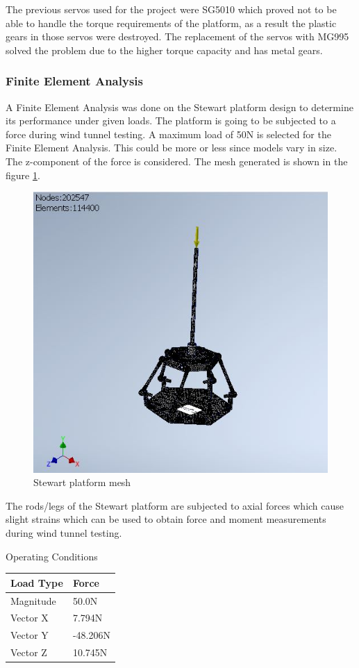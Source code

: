 The previous servos used for the project were SG5010 which proved not to be able to handle the torque requirements of the platform,
as a result the plastic gears in those servos were destroyed. The replacement of the servos with MG995 solved the problem due to the higher torque capacity and has metal gears.

\subsubsection{Finite Element Analysis}
A Finite Element Analysis was done on the Stewart platform design to determine its performance under given loads. The platform is going to be subjected to a force during wind tunnel testing. A maximum load of 50N is selected for the Finite Element Analysis. This could be more or less since models vary in size. The z-component of the force is considered.
The mesh generated is shown in the figure \ref{fig:feamesh}.
\begin{center}
	\begin{figure}[H]
		\centering
		\includegraphics[width=0.75\linewidth]{Figures/FEA}
		\caption[Stewart platform mesh]{Stewart platform mesh}
		\label{fig:feamesh}
	\end{figure}
\end{center}
The rods/legs of the Stewart platform are subjected to axial forces which cause slight strains which can be used to obtain force and moment measurements during wind tunnel testing.
\clearpage
\begin{center}
	\begin{table}[H]
		\caption{Operating Conditions}
		\centering
	\end{table}
	\begin{tabular}{|l|l|}
		\hline
		\textbf{Load Type} & \textbf{Force} \\
		\hline
		Magnitude          & 50.0N          \\
		\hline
		Vector X           & 7.794N         \\
		\hline
		Vector Y           & -48.206N       \\
		\hline
		Vector Z           & 10.745N        \\
		\hline
	\end{tabular}
\end{center}

